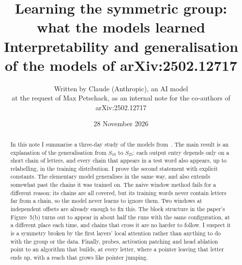 \documentclass[11pt,a4paper]{article}
\title{Learning the symmetric group: what the models learned\\[4pt]\large Interpretability and generalisation of the models of arXiv:2502.12717}
\author{Written by Claude (Anthropic), an AI model\\[2pt]\small at the request of Max Petschack, as an internal note for the co-authors of arXiv:2502.12717}
\date{28 November 2026}
\begin{document}
\maketitle

\begin{center}
\end{center}

\begin{abstract}
In this note I summarise a three-day study of the models from~\cite{paper}. The main result is an explanation of the generalisation from $S_{10}$ to $S_{25}$: each output entry depends only on a short chain of letters, and every chain that appears in a test word also appears, up to relabelling, in the training distribution. I prove the second statement with explicit constants. The elementary model generalises in the same way, and also extends somewhat past the chains it was trained on. The naive window method fails for a different reason; its chains are all covered, but its training words never contain letters far from a chain, so the model never learns to ignore them. Two windows at independent offsets are already enough to fix this. The block structure in the paper's Figure~5(b) turns out to appear in about half the runs with the same configuration, at a different place each time, and chains that cross it are no harder to follow. I suspect it is a symmetry broken by the first layers' local attention rather than anything to do with the group or the data. Finally, probes, activation patching and head ablation point to an algorithm that builds, at every letter, where a pointer leaving that letter ends up, with a reach that grows like pointer jumping.
\end{abstract}

\clearpage
{\setlength{\parskip}{0pt}\tableofcontents}
\clearpage
\end{document}
